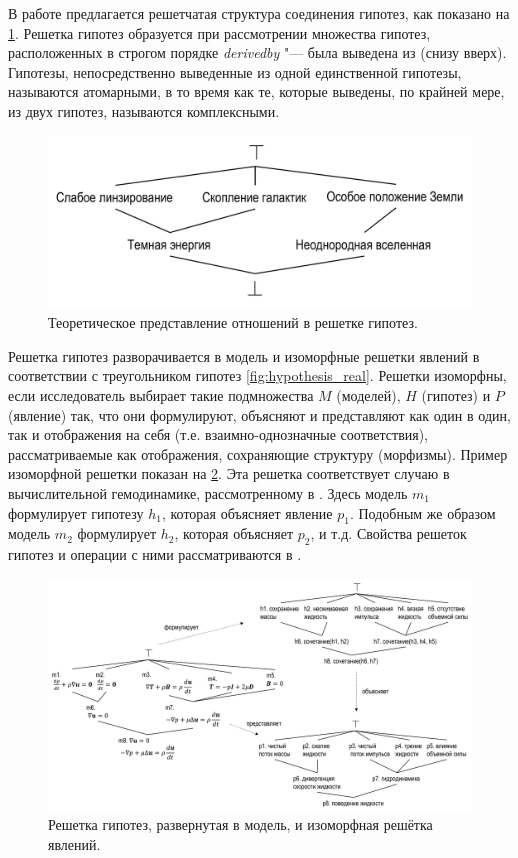 В работе \cite{Goncalves2013} предлагается решетчатая структура соединения гипотез, как показано на 
\cref{fig:hypothesis_relation}. Решетка гипотез образуется при рассмотрении множества гипотез, расположенных 
в строгом порядке \textit{derived\textunderscore by} "--- была выведена из (снизу вверх). Гипотезы, 
непосредственно выведенные из одной единственной гипотезы, называются атомарными, в то время как те, которые выведены, 
по крайней мере, из двух гипотез, называются комплексными.

\begin{figure}[ht]
    \centering
    \includegraphics[width=0.7\linewidth]{images/hypothesis_relation.pdf}
    \caption{Теоретическое представление отношений в решетке гипотез.}\label{fig:hypothesis_relation}
\end{figure}

Решетка гипотез разворачивается в модель и изоморфные решетки явлений в соответствии с треугольником 
гипотез \cref{fig:hypothesis_real}. Решетки изоморфны, если исследователь выбирает такие подмножества $M$ (моделей), 
$H$ (гипотез) и $P$ (явление) так, что они формулируют, объясняют и представляют как один в один, так и отображения 
на себя (т.е. взаимно-однозначные соответствия), рассматриваемые как отображения, сохраняющие структуру (морфизмы). 
Пример изоморфной решетки показан на \cref{fig:lattice_fluid}. Эта решетка соответствует случаю в вычислительной 
гемодинамике, рассмотренному в \cite{Goncalves2013}. Здесь модель $m_1$ формулирует гипотезу $h_1$, которая объясняет 
явление $p_1$. Подобным же образом модель $m_2$ формулирует $h_2$, которая объясняет $p_2$, и т.д. Свойства решеток 
гипотез и операции с ними рассматриваются в \cite{Goncalves2012}.

\begin{figure}[ht]
    \centering
    \includegraphics[width=1.0\linewidth]{images/lattice_fluid.pdf}
    \caption{Решетка гипотез, развернутая в модель, и изоморфная решётка явлений.}\label{fig:lattice_fluid}
\end{figure}

